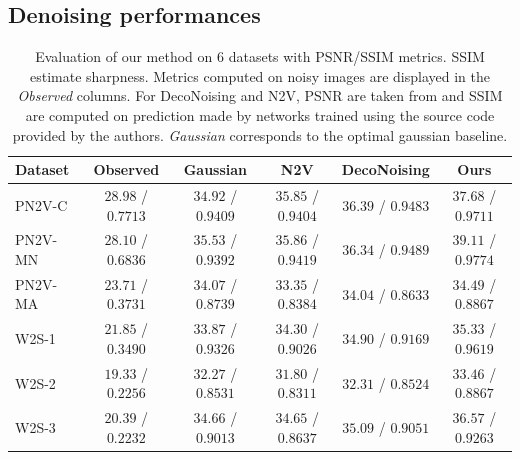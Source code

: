 \documentclass{article}
\begin{document}
\subsection{Denoising performances}
\begin{table}[t]
\caption{Evaluation of our method on 6 datasets with PSNR/SSIM metrics. SSIM estimate sharpness. Metrics computed on noisy images are displayed in the \textit{Observed} columns. For DecoNoising and N2V, PSNR are taken from \cite{goncharova2020} and SSIM are computed on prediction made by networks trained using the source code provided by the authors\footnotemark. \textit{Gaussian} corresponds to the optimal gaussian baseline\footnotemark.}
\label{results}
\vskip 0.15in
\begin{center}
\begin{small}
\begin{sc}
\begin{tabular}{lccccc}
\toprule
Dataset & Observed & Gaussian & N2V & DecoNoising & Ours \\
\midrule
PN2V-C & $28.98$ / $0.7713$ & $34.92$ / $0.9409$ & $35.85$ / $0.9404$ & $36.39$ / $0.9483$ & $37.68$ / $0.9711$ \\
PN2V-MN & $28.10$ / $0.6836$ & $35.53$ / $0.9392$ & $35.86$ / $0.9419$ & $36.34$ / $0.9489$ & $39.11$ / $0.9774$\\
PN2V-MA & $23.71$ / $0.3731$ & $34.07$ / $0.8739$ & $33.35$ / $0.8384$ & $34.04$ / $0.8633$ & $34.49$ / $0.8867$ \\
W2S-1 & $21.85$ / $0.3490$ & $33.87$ / $0.9326$ & $34.30$ / $0.9026$ & $34.90$ / $0.9169$ & $35.33$ / $0.9619$ \\
W2S-2 & $19.33$ / $0.2256$ & $32.27$ / $0.8531$ & $31.80$ / $0.8311$ & $32.31$ / $0.8524$ & $33.46$ / $0.8867$ \\
W2S-3 & $20.39$ / $0.2232$ & $34.66$ / $0.9013$ & $34.65$ / $0.8637$ & $35.09$ / $0.9051$ & $36.57$ / $0.9263$ \\
\bottomrule
\end{tabular}
\end{sc}
\end{small}
\end{center}
\vskip -0.1in
\end{table}
\addtocounter{footnote}{-1}
\addtocounter{footnote}{1}
\end{document}
